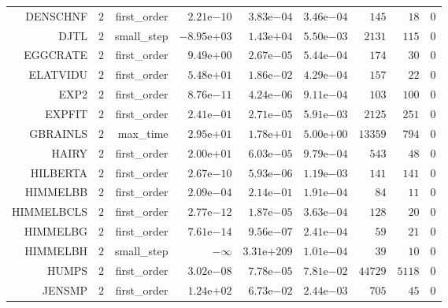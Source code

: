 \begin{longtable}{rrrrrrrrr}
DENSCHNF & \(     2\) & first\_order & \( 2.21\)e\(-10\) & \( 3.83\)e\(-04\) & \( 3.46\)e\(-04\) & \(   145\) & \(    18\) & \(     0\) \\
DJTL & \(     2\) & small\_step & \(-8.95\)e\(+03\) & \( 1.43\)e\(+04\) & \( 5.50\)e\(-03\) & \(  2131\) & \(   115\) & \(     0\) \\
EGGCRATE & \(     2\) & first\_order & \( 9.49\)e\(+00\) & \( 2.67\)e\(-05\) & \( 5.44\)e\(-04\) & \(   174\) & \(    30\) & \(     0\) \\
ELATVIDU & \(     2\) & first\_order & \( 5.48\)e\(+01\) & \( 1.86\)e\(-02\) & \( 4.29\)e\(-04\) & \(   157\) & \(    22\) & \(     0\) \\
EXP2 & \(     2\) & first\_order & \( 8.76\)e\(-11\) & \( 4.24\)e\(-06\) & \( 9.11\)e\(-04\) & \(   103\) & \(   100\) & \(     0\) \\
EXPFIT & \(     2\) & first\_order & \( 2.41\)e\(-01\) & \( 2.71\)e\(-05\) & \( 5.91\)e\(-03\) & \(  2125\) & \(   251\) & \(     0\) \\
GBRAINLS & \(     2\) & max\_time & \( 2.95\)e\(+01\) & \( 1.78\)e\(+01\) & \( 5.00\)e\(+00\) & \( 13359\) & \(   794\) & \(     0\) \\
HAIRY & \(     2\) & first\_order & \( 2.00\)e\(+01\) & \( 6.03\)e\(-05\) & \( 9.79\)e\(-04\) & \(   543\) & \(    48\) & \(     0\) \\
HILBERTA & \(     2\) & first\_order & \( 2.67\)e\(-10\) & \( 5.93\)e\(-06\) & \( 1.19\)e\(-03\) & \(   141\) & \(   141\) & \(     0\) \\
HIMMELBB & \(     2\) & first\_order & \( 2.09\)e\(-04\) & \( 2.14\)e\(-01\) & \( 1.91\)e\(-04\) & \(    84\) & \(    11\) & \(     0\) \\
HIMMELBCLS & \(     2\) & first\_order & \( 2.77\)e\(-12\) & \( 1.87\)e\(-05\) & \( 3.63\)e\(-04\) & \(   128\) & \(    20\) & \(     0\) \\
HIMMELBG & \(     2\) & first\_order & \( 7.61\)e\(-14\) & \( 9.56\)e\(-07\) & \( 2.41\)e\(-04\) & \(    59\) & \(    21\) & \(     0\) \\
HIMMELBH & \(     2\) & small\_step & \(-\infty\) & \(3.31\)e\(+209\) & \( 1.01\)e\(-04\) & \(    39\) & \(    10\) & \(     0\) \\
HUMPS & \(     2\) & first\_order & \( 3.02\)e\(-08\) & \( 7.78\)e\(-05\) & \( 7.81\)e\(-02\) & \( 44729\) & \(  5118\) & \(     0\) \\
JENSMP & \(     2\) & first\_order & \( 1.24\)e\(+02\) & \( 6.73\)e\(-02\) & \( 2.44\)e\(-03\) & \(   705\) & \(    45\) & \(     0\) \\

\end{longtable}
